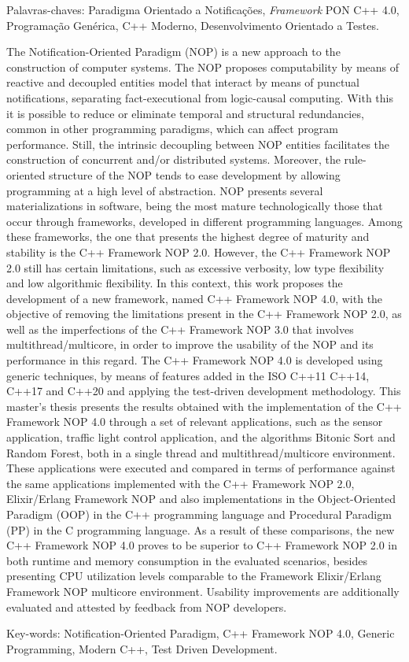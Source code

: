 \begin{resumo}
\vspace{\onelineskip}
Palavras-chaves: Paradigma Orientado a Notificações, \textit{Framework} PON C++ 4.0, Programação Genérica, C++
Moderno, Desenvolvimento Orientado a Testes.

\end{resumo}

\begin{resumo}[Abstract]

The Notification-Oriented Paradigm (NOP) is a new approach to the construction
of computer systems. The NOP proposes computability by means of reactive and
decoupled entities model that interact by means of punctual notifications,
separating fact-executional from logic-causal computing. With this it is
possible to reduce or eliminate temporal and structural redundancies, common in
other programming paradigms, which can affect program performance. Still, the
intrinsic decoupling between NOP entities facilitates the construction of
concurrent and/or distributed systems. Moreover, the rule-oriented structure of
the NOP tends to ease development by allowing programming at a high level of
abstraction. NOP presents several materializations in software, being the
most mature technologically those that occur through frameworks, developed in
different programming languages. Among these frameworks, the one that presents
the highest degree of maturity and stability is the C++ Framework NOP 2.0.
However, the C++ Framework NOP 2.0 still has certain limitations, such as
excessive verbosity, low type flexibility and low algorithmic flexibility. In
this context, this work proposes the development of a new framework, named C++
Framework NOP 4.0, with the objective of removing the limitations present in the
C++ Framework NOP 2.0, as well as the imperfections of the C++ Framework NOP 3.0
that involves multithread/multicore, in order to improve the usability of the
NOP and its performance in this regard. The C++ Framework NOP 4.0 is developed
using generic techniques, by means of features added in the ISO C++11 C++14,
C++17 and C++20 and applying the test-driven development methodology. This
master's thesis presents the results obtained with the implementation of the C++
Framework NOP 4.0 through a set of relevant applications, such as the sensor
application, traffic light control application, and the algorithms Bitonic Sort
and Random Forest, both in a single thread and multithread/multicore
environment. These applications were executed and compared in terms of
performance against the same applications implemented with the C++ Framework NOP
2.0, Elixir/Erlang Framework NOP and also implementations in the Object-Oriented
Paradigm (OOP) in the C++ programming language and Procedural Paradigm (PP) in
the C programming language. As a result of these comparisons, the new C++
Framework NOP 4.0 proves to be superior to C++ Framework NOP 2.0 in both runtime
and memory consumption in the evaluated scenarios, besides presenting CPU
utilization levels comparable to the Framework Elixir/Erlang Framework
NOP multicore environment. Usability improvements are additionally
evaluated and attested by feedback from NOP developers.

\vspace{\onelineskip}
Key-words: Notification-Oriented Paradigm, C++ Framework NOP 4.0, Generic Programming, Modern C++, Test
Driven Development.
\end{resumo}
